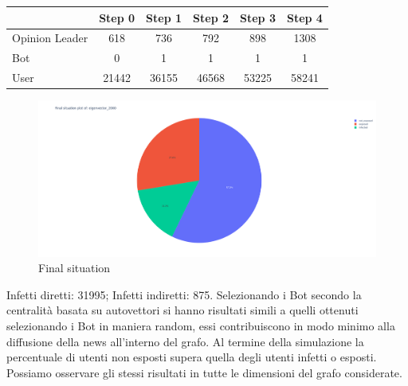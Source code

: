         \begin{table}[H]
            \centering
            \begin{tabular}{|l|c|c|c|c|c|}
            \hline
                           & Step 0 & Step 1 & Step 2 & Step 3 & Step 4 \\ \hline
            Opinion Leader & 618    & 736    & 792    & 898    & 1308   \\ \hline
            Bot            & 0      & 1      & 1      & 1      & 1      \\ \hline
            User           & 21442  & 36155  & 46568  & 53225  & 58241  \\ \hline
            \end{tabular}
        \end{table}
                
        \begin{figure}[H]
            \includegraphics[width=16cm]{resources/charts/eig_2000_pie.png}
            \caption{Final situation}
            \label{fig:btw_2000_pie}
        \end{figure}
        Infetti diretti: 31995;\newline
        Infetti indiretti: 875.
        \newline 
        \newline
        Selezionando i Bot secondo la centralità basata su autovettori si hanno risultati simili a quelli ottenuti selezionando i Bot in maniera random, essi contribuiscono in modo minimo alla diffusione della news all’interno del grafo. Al termine della simulazione la percentuale di utenti non esposti supera quella degli utenti infetti o esposti. \newline
        Possiamo osservare gli stessi risultati in tutte le dimensioni del grafo considerate. 

    
        
        
        
                
        
        
        

